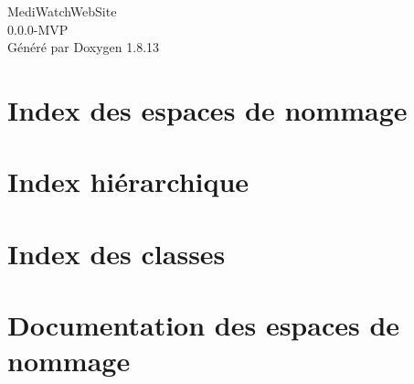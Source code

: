 \documentclass[twoside]{book}
\newcommand{\+}{\discretionary{\mbox{\scriptsize$\hookleftarrow$}}{}{}}
\newcommand{\clearemptydoublepage}{%
  \newpage{\pagestyle{empty}\cleardoublepage}%
}
\begin{document}
\hypersetup{pageanchor=false,
             bookmarksnumbered=true,
             pdfencoding=unicode
            }
\begin{titlepage}
\vspace*{7cm}
\begin{center}%
{\Large Medi\+Watch\+Web\+Site \\[1ex]\large 0.\+0.\+0-\/\+M\+VP }\\
\vspace*{1cm}
{\large Généré par Doxygen 1.8.13}\\
\end{center}
\end{titlepage}
\clearemptydoublepage
{}
\tableofcontents
\clearemptydoublepage
{}
\hypersetup{pageanchor=true}

\chapter{Index des espaces de nommage}

\chapter{Index hiérarchique}

\chapter{Index des classes}

\chapter{Documentation des espaces de nommage}










\end{document}
